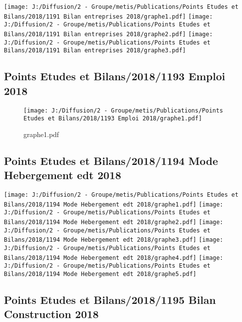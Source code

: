\documentclass[
]{article}
\begin{document}
\texttt{[image: J:/Diffusion/2 - Groupe/metis/Publications/Points Etudes et Bilans/2018/1191 Bilan entreprises 2018/graphe1.pdf]}
\texttt{[image: J:/Diffusion/2 - Groupe/metis/Publications/Points Etudes et Bilans/2018/1191 Bilan entreprises 2018/graphe2.pdf]}
\texttt{[image: J:/Diffusion/2 - Groupe/metis/Publications/Points Etudes et Bilans/2018/1191 Bilan entreprises 2018/graphe3.pdf]}

\hypertarget{points-etudes-et-bilans20181193-emploi-2018}{%
\subsection{Points Etudes et Bilans/2018/1193 Emploi
2018}\label{points-etudes-et-bilans20181193-emploi-2018}}

\begin{figure}
\centering
\texttt{[image: J:/Diffusion/2 - Groupe/metis/Publications/Points Etudes et Bilans/2018/1193 Emploi 2018/graphe1.pdf]}
\caption{graphe1.pdf}
\end{figure}

\hypertarget{points-etudes-et-bilans20181194-mode-hebergement-edt-2018}{%
\subsection{Points Etudes et Bilans/2018/1194 Mode Hebergement edt
2018}\label{points-etudes-et-bilans20181194-mode-hebergement-edt-2018}}

\texttt{[image: J:/Diffusion/2 - Groupe/metis/Publications/Points Etudes et Bilans/2018/1194 Mode Hebergement edt 2018/graphe1.pdf]}
\texttt{[image: J:/Diffusion/2 - Groupe/metis/Publications/Points Etudes et Bilans/2018/1194 Mode Hebergement edt 2018/graphe2.pdf]}
\texttt{[image: J:/Diffusion/2 - Groupe/metis/Publications/Points Etudes et Bilans/2018/1194 Mode Hebergement edt 2018/graphe3.pdf]}
\texttt{[image: J:/Diffusion/2 - Groupe/metis/Publications/Points Etudes et Bilans/2018/1194 Mode Hebergement edt 2018/graphe4.pdf]}
\texttt{[image: J:/Diffusion/2 - Groupe/metis/Publications/Points Etudes et Bilans/2018/1194 Mode Hebergement edt 2018/graphe5.pdf]}

\hypertarget{points-etudes-et-bilans20181195-bilan-construction-2018}{%
\subsection{Points Etudes et Bilans/2018/1195 Bilan Construction
2018}\label{points-etudes-et-bilans20181195-bilan-construction-2018}}
\end{document}
